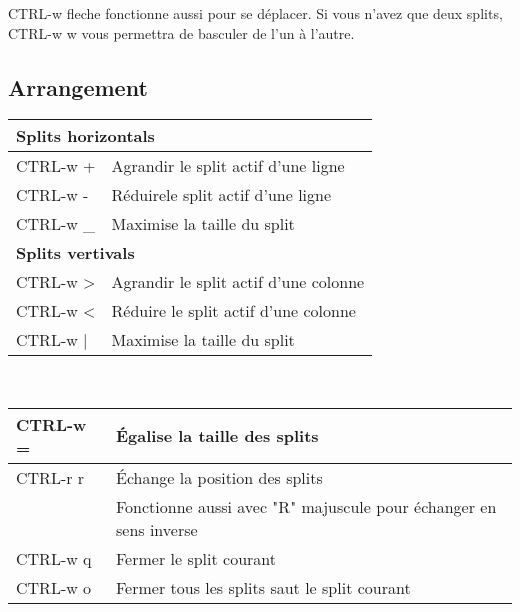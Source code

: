 \documentclass{article}
\begin{document}
                    \noindent
                    CTRL-w fleche fonctionne aussi pour se déplacer. Si vous n'avez que deux splits, CTRL-w w vous permettra de basculer de l'un à l'autre.
                    \subsection{Arrangement}

                    \begin{tabular}{|p{3cm}| l| }\hline
                        \multicolumn{2}{|l|}{\textbf{Splits horizontals}} \\ \hline
                        CTRL-w + & Agrandir le split actif d'une ligne\\ \hline
                        CTRL-w - & Réduirele split actif d'une ligne\\ \hline
                        CTRL-w \_ & Maximise la taille du split\\ \hline
                        \multicolumn{2}{|l|}{\textbf{Splits vertivals}}\\ \hline
                        CTRL-w > & Agrandir le split actif d'une colonne \\ \hline
                        CTRL-w < & Réduire le split actif d'une colonne \\ \hline
                        CTRL-w | & Maximise la taille du split\\ \hline
                    \end{tabular}\\[1.5em]


                    \begin{tabular}{|p{3cm}| l| }\hline
                        CTRL-w = & Égalise la taille des splits \\ \hline
                        CTRL-r r & Échange la position des splits\\
                        & Fonctionne aussi avec "R" majuscule pour échanger en sens inverse \\ \hline
                        CTRL-w q & Fermer le split courant \\ \hline
                        CTRL-w o & Fermer tous les splits saut le split courant \\ \hline
                    \end{tabular}\\
\end{document}
